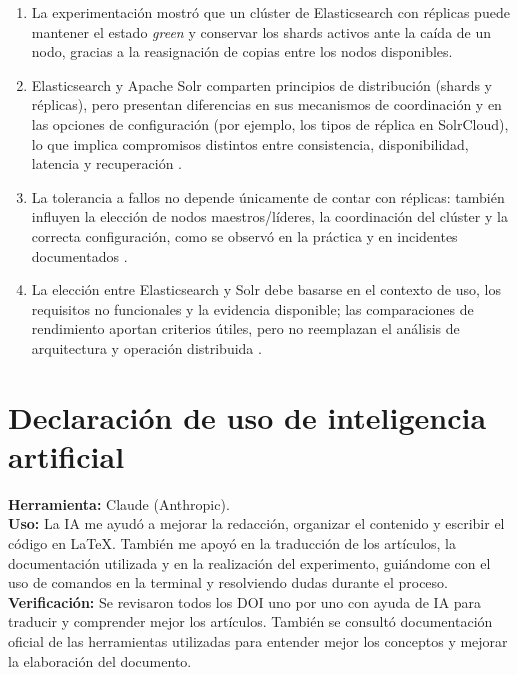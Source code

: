 \documentclass[12pt,a4paper]{article}
\begin{document}
\begin{enumerate}
    \item La experimentación mostró que un clúster de Elasticsearch con réplicas puede mantener el estado \textit{green} y conservar los shards activos ante la caída de un nodo, gracias a la reasignación de copias entre los nodos disponibles.
    \item Elasticsearch y Apache Solr comparten principios de distribución (shards y réplicas), pero presentan diferencias en sus mecanismos de coordinación y en las opciones de configuración (por ejemplo, los tipos de réplica en SolrCloud), lo que implica compromisos distintos entre consistencia, disponibilidad, latencia y recuperación \cite{elastic_read_write,solr_shards_indexing,solr_recoveries}.
    \item La tolerancia a fallos no depende únicamente de contar con réplicas: también influyen la elección de nodos maestros/líderes, la coordinación del clúster y la correcta configuración, como se observó en la práctica y en incidentes documentados \cite{elastic_discovery,elastic_resilience,elastic_cloud_incident_2019,solr_jira_7844}.
    \item La elección entre Elasticsearch y Solr debe basarse en el contexto de uso, los requisitos no funcionales y la evidencia disponible; las comparaciones de rendimiento aportan criterios útiles, pero no reemplazan el análisis de arquitectura y operación distribuida \cite{deniz-2023,unger-2023,feraru-2026}.
\end{enumerate}

\section{Declaración de uso de inteligencia artificial}

\textbf{Herramienta:} Claude (Anthropic).\\
\textbf{Uso:} La IA me ayudó a mejorar la redacción, organizar el contenido y escribir el código en LaTeX. También me apoyó en la traducción de los artículos, la documentación utilizada y en la realización del experimento, guiándome con el uso de comandos en la terminal y resolviendo dudas durante el proceso.\\
\textbf{Verificación:} Se revisaron todos los DOI uno por uno con ayuda de IA para traducir y comprender mejor los artículos. También se consultó documentación oficial de las herramientas utilizadas para entender mejor los conceptos y mejorar la elaboración del documento.\\[4pt]
\end{document}
